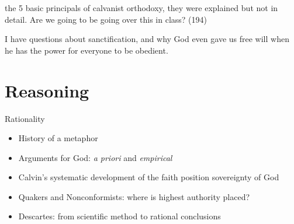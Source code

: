 \begin{frame}[label=sec-1-4]{}
the 5 basic principals of calvanist orthodoxy, they were explained but not in detail. Are we going to be going over this in class? (194)
\end{frame}

\begin{frame}[label=sec-1-5]{}
I have questions about sanctification, and why God even gave us free will when he has the power for everyone to be obedient. 
\end{frame}

\section{Reasoning}
\label{sec-2}
\begin{frame}[label=sec-2-1]{Rationality}
\begin{itemize}[<+->]
\item History of a metaphor
\item Arguments for God: \emph{a priori} and \emph{empirical}
\item Calvin's systematic development of the faith position \alert{sovereignty of God}
\item Quakers and Nonconformists: where is highest authority placed?
\item Descartes: from scientific method to rational conclusions
\end{itemize}
\end{frame}

